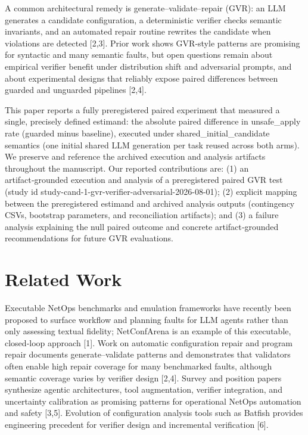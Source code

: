 \documentclass[conference]{IEEEtran}
\begin{document}
A common architectural remedy is generate--validate--repair (GVR): an LLM generates a candidate configuration, a deterministic verifier checks semantic invariants, and an automated repair routine rewrites the candidate when violations are detected [2,3]. Prior work shows GVR‑style patterns are promising for syntactic and many semantic faults, but open questions remain about empirical verifier benefit under distribution shift and adversarial prompts, and about experimental designs that reliably expose paired differences between guarded and unguarded pipelines [2,4].

This paper reports a fully preregistered paired experiment that measured a single, precisely defined estimand: the absolute paired difference in unsafe\_apply rate (guarded minus baseline), executed under shared\_initial\_candidate semantics (one initial shared LLM generation per task reused across both arms). We preserve and reference the archived execution and analysis artifacts throughout the manuscript. Our reported contributions are: (1) an artifact‑grounded execution and analysis of a preregistered paired GVR test (study id study-cand-1-gvr-verifier-adversarial-2026-08-01); (2) explicit mapping between the preregistered estimand and archived analysis outputs (contingency CSVs, bootstrap parameters, and reconciliation artifacts); and (3) a failure analysis explaining the null paired outcome and concrete artifact‑grounded recommendations for future GVR evaluations.

\section{Related Work}
Executable NetOps benchmarks and emulation frameworks have recently been proposed to surface workflow and planning faults for LLM agents rather than only assessing textual fidelity; NetConfArena is an example of this executable, closed‑loop approach [1]. Work on automatic configuration repair and program repair documents generate--validate patterns and demonstrates that validators often enable high repair coverage for many benchmarked faults, although semantic coverage varies by verifier design [2,4]. Survey and position papers synthesize agentic architectures, tool augmentation, verifier integration, and uncertainty calibration as promising patterns for operational NetOps automation and safety [3,5]. Evolution of configuration analysis tools such as Batfish provides engineering precedent for verifier design and incremental verification [6].
\end{document}
